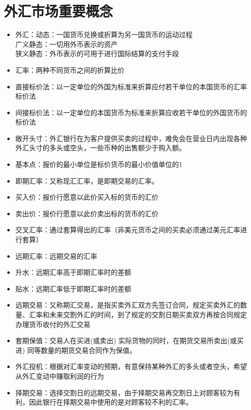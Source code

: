 \documentclass{article}
\begin{document}
\section*{\center 外汇市场重要概念}

    \begin{spacing}{0.9}
        \begin{itemize}
            \item 	外汇：动态：一国货币兑换或折算为另一国货币的运动过程\\
            广义静态：一切用外币表示的资产\\
            狭义静态：外币表示的可用于进行国际结算的支付手段
            \item    汇率：两种不同货币之间的折算比价
            \item    直接标价法：以一定单位的外国为标准来折算应付若干单位的本国货币的汇率标价法
            \item    间接标价法：以一定单位的本国货币为标准来折算应收若干单位的外国货币的标价法
            \item    敞开头寸：外汇银行在为客户提供买卖的过程中，难免会在营业日内出现各种外汇头寸的多头或空头，一些币种的出售额少于购入额。
            \item    基本点：报价的最小单位是标价货币的最小价值单位的1%
            \item    即期汇率：又称现汇汇率，是即期交易的汇率。
            \item    买入价：报价行愿意以此价买入标的货币的汇价
            \item    卖出价：报价行愿意以此价卖出标的货币的汇价
            \item    交叉汇率：通过套算得出的汇率（非美元货币之间的买卖必须通过美元汇率进行套算）
            \item    远期汇率：远期交易的汇率
            \item   升水：远期汇率高于即期汇率时的差额
            \item   贴水：远期汇率低于即期汇率时的差额
            \item   远期交易：又称期汇交易，是指买卖外汇双方先签订合同，规定买卖外汇的数量、汇率和未来交割外汇的时间，到了规定的交割日期买卖双方再按合同规定办理货币收付的外汇交易
            \item   套期保值：交易人在买进(或卖出) 实际货物的同时，在期货交易所卖出(或买进) 同等数量的期货交易合同作为保值。
            \item   外汇投机：根据对汇率变动的预期，有意保持某种外汇的多头或者空头，希望从外汇变动中赚取利润的行为
            \item   择期交易：选择交割日的远期交易，由于择期交易再交割日上对顾客较为有利，因此银行在择期交易中使用的是对顾客较不利的汇率。

\end{itemize}
\end{spacing}
\end{document}
